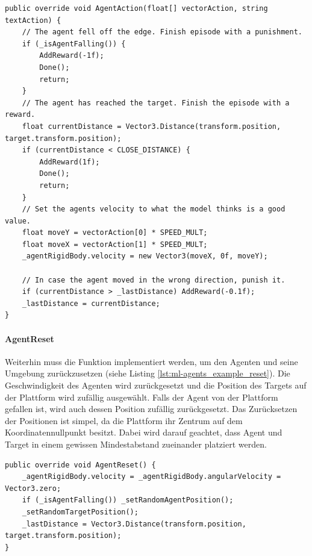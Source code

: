 \begin{minipage}{\linewidth}
\begin{lstlisting}[linewidth=16.4cm, caption={ML-Agents-Beispiel, AgentAction}, label=lst:ml-agents_example_actions, xleftmargin=1cm]
public override void AgentAction(float[] vectorAction, string textAction) {
    // The agent fell off the edge. Finish episode with a punishment.
    if (_isAgentFalling()) {
        AddReward(-1f);
        Done();
        return;
    }
    // The agent has reached the target. Finish the episode with a reward.
    float currentDistance = Vector3.Distance(transform.position, target.transform.position);
    if (currentDistance < CLOSE_DISTANCE) {
        AddReward(1f);
        Done();
        return;
    }
    // Set the agents velocity to what the model thinks is a good value.
    float moveY = vectorAction[0] * SPEED_MULT;
    float moveX = vectorAction[1] * SPEED_MULT;
    _agentRigidBody.velocity = new Vector3(moveX, 0f, moveY);

    // In case the agent moved in the wrong direction, punish it.
    if (currentDistance > _lastDistance) AddReward(-0.1f); 
    _lastDistance = currentDistance;
}
\end{lstlisting}
\end{minipage}


\paragraph{AgentReset}
Weiterhin muss die Funktion  implementiert werden, um den Agenten und seine Umgebung zurückzusetzen (siehe Listing \ref{lst:ml-agents_example_reset}). Die Geschwindigkeit des Agenten wird zurückgesetzt und die Position des Targets auf der Plattform wird zufällig ausgewählt. Falls der Agent von der Plattform gefallen ist, wird auch dessen Position zufällig zurückgesetzt. Das Zurücksetzen der Positionen ist simpel, da die Plattform ihr Zentrum auf dem Koordinatennullpunkt besitzt. Dabei wird darauf geachtet, dass Agent und Target in einem gewissen Mindestabstand zueinander platziert werden.

\begin{minipage}{\linewidth}
\begin{lstlisting}[linewidth=16.4cm, caption={ML-Agents-Beispiel, AgentReset}, label=lst:ml-agents_example_reset, xleftmargin=1cm]
public override void AgentReset() {
    _agentRigidBody.velocity = _agentRigidBody.angularVelocity = Vector3.zero;
    if (_isAgentFalling()) _setRandomAgentPosition();
    _setRandomTargetPosition();
    _lastDistance = Vector3.Distance(transform.position, target.transform.position);
}
\end{lstlisting}
\end{minipage}


